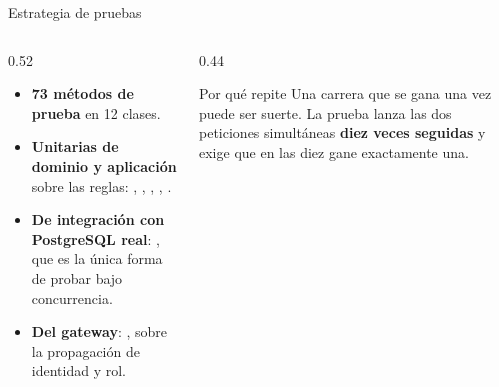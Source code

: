 \begin{frame}{Estrategia de pruebas}
  \begin{columns}[T]
    \begin{column}{0.52\textwidth}
      \begin{itemize}\footnotesize
        \item \textbf{73 métodos de prueba} en 12 clases.
        \item \textbf{Unitarias de dominio y aplicación} sobre las reglas:
              ,
              , ,
              , .
        \item \textbf{De integración con PostgreSQL real}:
              , que es la única forma de probar
               bajo concurrencia.
        \item \textbf{Del gateway}: , sobre la
              propagación de identidad y rol.
      \end{itemize}
    \end{column}
    \begin{column}{0.44\textwidth}
      \begin{block}{Por qué  repite}
        \footnotesize
        Una carrera que se gana una vez puede ser suerte. La prueba lanza las
        dos peticiones simultáneas \textbf{diez veces seguidas} y exige que en
        las diez gane exactamente una.
      \end{block}
    \end{column}
  \end{columns}
\end{frame}

